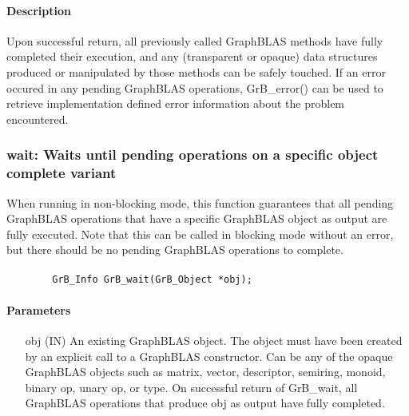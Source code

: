 \paragraph{Description}

Upon successful return, all previously called GraphBLAS methods have fully
completed their execution, and any (transparent or opaque) data structures
produced or manipulated by those methods can be safely touched.  If an
error occured in any pending GraphBLAS operations, {\sf GrB\_error()}
can be used to retrieve implementation defined error information about
the problem encountered.

\subsubsection{{\sf wait}: Waits until pending operations on a specific object complete variant}
\label{Sec:GrB_waitOne}

When running in non-blocking mode, this function guarantees that all
pending GraphBLAS operations that have a specific GraphBLAS object as
output are fully executed.  Note that this can be called in blocking mode
without an error, but there should be no pending GraphBLAS operations
to complete.

\paragraph{\syntax}

\begin{verbatim}
        GrB_Info GrB_wait(GrB_Object *obj);
\end{verbatim}

\paragraph{Parameters}

\begin{itemize}[leftmargin=1.1in]
        \item[{\sf obj}] ({\sf IN}) An existing GraphBLAS object.
        The object must have been created by an explicit call to a
        GraphBLAS constructor.  Can be any of the opaque GraphBLAS
        objects such as matrix, vector, descriptor, semiring, monoid,
        binary op, unary op, or type. On successful return of {\sf
        GrB\_wait}, all GraphBLAS operations that produce {\sf obj}
        as output have fully completed.
\end{itemize}

